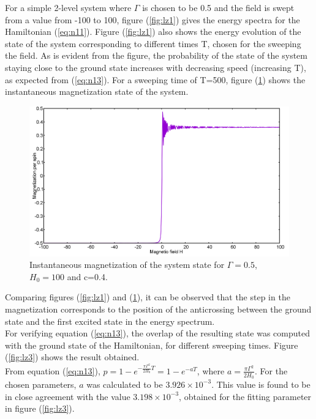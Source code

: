 \documentclass[12]{article}
\begin{document}
For a simple 2-level system where $\Gamma$ is chosen to be 0.5 and the field is swept from a value from -100 to 100, figure (\ref{fig:lz1}) gives the energy spectra for the Hamiltonian (\ref{eq:n11}).
Figure (\ref{fig:lz1}) also shows the energy evolution of the state of the system corresponding to different times T, chosen for the sweeping the field. As is evident from the figure, the probability of the state of the system staying close to the ground state increases with decreasing speed (increasing T), as expected from (\ref{eq:n13}). For a sweeping time of T=500, figure (\ref{fig:lz2}) shows the instantaneous magnetization state of the system.
\begin{figure}[H]
\centering 
\includegraphics[scale=0.3]{Magnetization_500.png}
\caption{Instantaneous magnetization of the system state for $\Gamma=0.5$, $H_0=100$ and c=0.4.}
\label{fig:lz2}
\end{figure}
Comparing figures (\ref{fig:lz1}) and (\ref{fig:lz2}), it can be observed that the step in the magnetization corresponds to the position of the anticrossing between the ground state and the first excited state in the energy spectrum.\\

For verifying equation (\ref{eq:n13}), the overlap of the resulting state was computed with the ground state of the Hamiltonian, for different sweeping times. Figure (\ref{fig:lz3}) shows the result obtained.\\

From equation (\ref{eq:n13}), $p=1-e^{-\frac{\pi \Gamma^2}{2H_0} T}=1-e^{-aT}$, where $a=\frac{\pi \Gamma^2}{2H_0}$. For the chosen parameters, $a$ was calculated to be $3.926 \times 10^{-3}$. This value is found to be in close agreement with the value $3.198 \times 10^{-3}$, obtained for the fitting parameter in figure (\ref{fig:lz3}).
\end{document}
